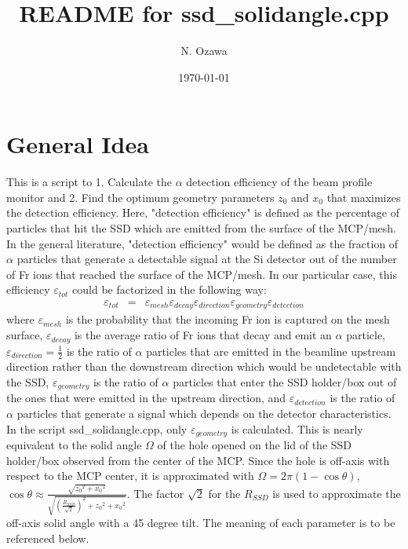 \documentclass{article}
\title{README for ssd\_solidangle.cpp}
\author{N. Ozawa}
\date{\today}
\begin{document}
\maketitle

\section{General Idea}
This is a script to 1. Calculate the $\alpha$ detection efficiency of the beam profile monitor and 2. Find the optimum geometry parameters $z_0$ and $x_0$ that maximizes the detection efficiency. Here, "detection efficiency" is defined as the percentage of particles that hit the SSD which are emitted from the surface of the MCP/mesh. In the general literature, "detection efficiency" would be defined as the fraction of $\alpha$ particles that generate a detectable signal at the Si detector out of the number of Fr ions that reached the surface of the MCP/mesh. In our particular case, this efficiency $\varepsilon_{tot}$ could be factorized in the following way:
\begin{eqnarray*}
\varepsilon_{tot} & = & \varepsilon_{mesh} \varepsilon_{decay} \varepsilon_{direction} \varepsilon_{geometry} \varepsilon_{detection}
\end{eqnarray*}
where $\varepsilon_{mesh}$ is the probability that the incoming Fr ion is captured on the mesh surface, $\varepsilon_{decay}$ is the average ratio of Fr ions that decay and emit an $\alpha$ particle, $\varepsilon_{direction} = \frac{1}{2}$ is the ratio of $\alpha$ particles that are emitted in the beamline upstream direction rather than the downstream direction which would be undetectable with the SSD, $\varepsilon_{geometry}$ is the ratio of $\alpha$ particles that enter the SSD holder/box out of the ones that were emitted in the upstream direction, and $\varepsilon_{detection}$ is the ratio of $\alpha$ particles that generate a signal which depends on the detector characteristics. In the script ssd\_solidangle.cpp, only $\varepsilon_{geometry}$ is calculated. This is nearly equivalent to the solid angle $\Omega$ of the hole opened on the lid of the SSD holder/box observed from the center of the MCP. Since the hole is off-axis with respect to the MCP center, it is approximated with $\Omega = 2\pi (1 - \cos{\theta})$, $\cos{\theta} \approx \frac{\sqrt{{z_0}^2+{x_0}^2 }}{\sqrt{\left(\frac{R_{SSD}}{\sqrt{2}}\right)^2 + {z_0}^2 + {x_0}^2}}$. The factor $\sqrt{2}$ for the $R_{SSD}$ is used to approximate the off-axis solid angle with a 45 degree tilt. The meaning of each parameter is to be referenced below. \\
\end{document}
